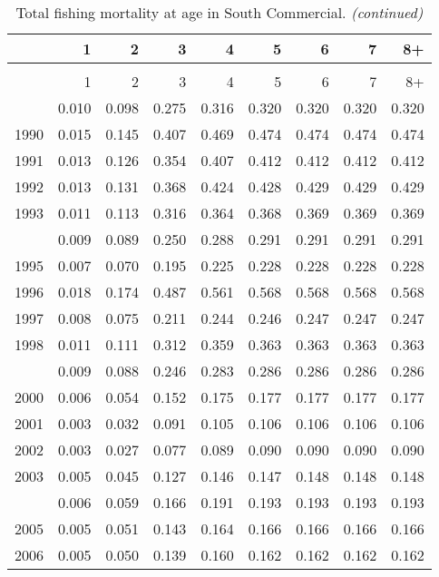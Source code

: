 \documentclass[
]{article}
\begin{document}
\begin{longtable}[t]{lrrrrrrrr}
\caption{\label{tab:South_Commercial-fleet-FAA-table}Total fishing mortality at age in South Commercial.}\\
\toprule
  & 1 & 2 & 3 & 4 & 5 & 6 & 7 & 8+\\
\midrule
\endfirsthead
\caption[]{Total fishing mortality at age in South Commercial. \textit{(continued)}}\\
\toprule
  & 1 & 2 & 3 & 4 & 5 & 6 & 7 & 8+\\
\midrule
\endhead

\endfoot
\bottomrule
\endlastfoot
1989 & 0.010 & 0.098 & 0.275 & 0.316 & 0.320 & 0.320 & 0.320 & 0.320\\
1990 & 0.015 & 0.145 & 0.407 & 0.469 & 0.474 & 0.474 & 0.474 & 0.474\\
1991 & 0.013 & 0.126 & 0.354 & 0.407 & 0.412 & 0.412 & 0.412 & 0.412\\
1992 & 0.013 & 0.131 & 0.368 & 0.424 & 0.428 & 0.429 & 0.429 & 0.429\\
1993 & 0.011 & 0.113 & 0.316 & 0.364 & 0.368 & 0.369 & 0.369 & 0.369\\
\addlinespace
1994 & 0.009 & 0.089 & 0.250 & 0.288 & 0.291 & 0.291 & 0.291 & 0.291\\
1995 & 0.007 & 0.070 & 0.195 & 0.225 & 0.228 & 0.228 & 0.228 & 0.228\\
1996 & 0.018 & 0.174 & 0.487 & 0.561 & 0.568 & 0.568 & 0.568 & 0.568\\
1997 & 0.008 & 0.075 & 0.211 & 0.244 & 0.246 & 0.247 & 0.247 & 0.247\\
1998 & 0.011 & 0.111 & 0.312 & 0.359 & 0.363 & 0.363 & 0.363 & 0.363\\
\addlinespace
1999 & 0.009 & 0.088 & 0.246 & 0.283 & 0.286 & 0.286 & 0.286 & 0.286\\
2000 & 0.006 & 0.054 & 0.152 & 0.175 & 0.177 & 0.177 & 0.177 & 0.177\\
2001 & 0.003 & 0.032 & 0.091 & 0.105 & 0.106 & 0.106 & 0.106 & 0.106\\
2002 & 0.003 & 0.027 & 0.077 & 0.089 & 0.090 & 0.090 & 0.090 & 0.090\\
2003 & 0.005 & 0.045 & 0.127 & 0.146 & 0.147 & 0.148 & 0.148 & 0.148\\
\addlinespace
2004 & 0.006 & 0.059 & 0.166 & 0.191 & 0.193 & 0.193 & 0.193 & 0.193\\
2005 & 0.005 & 0.051 & 0.143 & 0.164 & 0.166 & 0.166 & 0.166 & 0.166\\
2006 & 0.005 & 0.050 & 0.139 & 0.160 & 0.162 & 0.162 & 0.162 & 0.162\\

\end{longtable}
\end{document}
